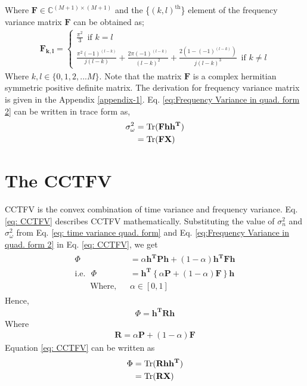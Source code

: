 Where $ \mathbf{F} \in {\mathbb{C}^{(M + 1) \times (M + 1)}}$ and the \{$(k,l)^\text{th}$\} element of the frequency variance matrix $\mathbf{F}$ can be obtained as;
 \begin{eqnarray}
 \label{Freq. Var. matrix elements}
 \mathbf{F_{k,l}} =  \begin{cases}
 \frac{\pi^2}{3}\,\,\, \text{if}\,\, k=l \\ 
 \frac{\pi^2{(-1)^{(l-k)}}}{j(l-k)} + \frac{2\pi{(-1)^{(l-k)}}}{(l-k)^2} + \frac{2\left(1 - {(-1)^{(l-k)}}\right)}{j{(l-k)^3}}\,\,\, \text{if}\,\,  k \neq l
 \end{cases}
 \end{eqnarray}
 Where ${k,l} \in \{0,1,2,...M\}$. Note that the matrix $\mathbf{F}$ is a complex hermitian symmetric positive definite matrix. The derivation for frequency variance matrix is given in the Appendix \ref{appendix-1}. Eq. \ref{eq:Frequency Variance in quad. form 2} can be written in trace form as,
 \begin{eqnarray}
 \label{eq: Freq. Var. in trace form}
 \begin{aligned}
 \sigma_{\omega}^{2} &= \operatorname{Tr}({\mathbf{Fhh^T}})\\
 					 &=	\operatorname{Tr}({\mathbf{FX}})
 \end{aligned}
  \end{eqnarray}
\section{The CCTFV}
\label{sec: CCTFV}
CCTFV is the convex combination of time variance and frequency variance. Eq. \ref{eq: CCTFV} describes CCTFV mathematically. Substituting the value of $\sigma_n^2$ and $\sigma_{\omega}^{2}$  from Eq. \ref{eq: time variance quad. form} and Eq. \ref{eq:Frequency Variance in quad. form 2} in Eq. \ref{eq: CCTFV}, we get
\begin{eqnarray*}
\begin{aligned}
\Phi &= \alpha \mathbf{h^TPh}  + (1 - \alpha) \mathbf{h^TFh} \\
\text{i.e.} \,\,\,\,
\Phi &= \mathbf{h^T} \left\{\alpha \mathbf{P}  + (1 - \alpha) \mathbf{F}\right\}\mathbf{h}\\
\,\,\,\,\,\,\,\,\,\,\, \text{Where,} \,\,\,\,\,
& \alpha \in [0,1]
\end{aligned}
\end{eqnarray*}
Hence,
\begin{eqnarray}
\label{eq: CCTFV in quad. form}
\Phi = \mathbf{h^TRh}
\end{eqnarray}
Where 
\begin{eqnarray}
\label{eq: matrix R}
\mathbf{R} = \alpha \mathbf{P}  + (1 - \alpha) \mathbf{F}
\end{eqnarray}
Equation \ref{eq: CCTFV} can be written as 
\begin{eqnarray}
\label{eq: CCTFV trace form}
\begin{aligned}
\Phi &= \operatorname{Tr}(\mathbf{Rh{h^T}})\\
       &= \operatorname{Tr}(\mathbf{RX})    
\end{aligned}
\end{eqnarray}
